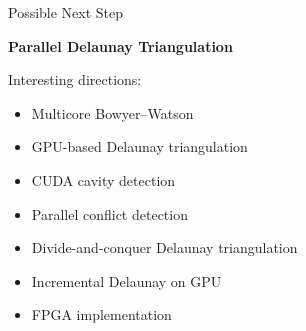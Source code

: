 \documentclass[aspectratio=169]{beamer}
\begin{document}
\begin{frame}{Possible Next Step}

\begin{center}
\Large
\textbf{Parallel Delaunay Triangulation}
\end{center}

\vspace{0.5cm}

Interesting directions:

\begin{itemize}
    \item Multicore Bowyer--Watson
    \item GPU-based Delaunay triangulation
    \item CUDA cavity detection
    \item Parallel conflict detection
    \item Divide-and-conquer Delaunay triangulation
    \item Incremental Delaunay on GPU
    \item FPGA implementation
\end{itemize}

\end{frame}
\end{document}
